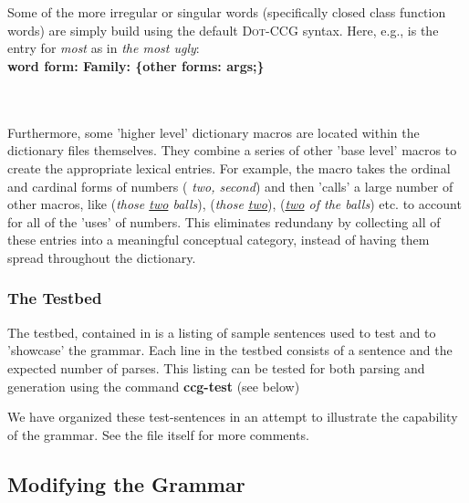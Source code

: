              
             
               \\ \\
Some of the more irregular or singular words (specifically closed class function words) are simply
build using the default \textsc{Dot-CCG} syntax. Here, e.g., is the entry for \emph{most} as in \emph{the most ugly}:  \\

\textbf{ word form: Family: \{other forms: args;\}  } 

 \\ \\
Furthermore, some 'higher level' dictionary macros are located within the dictionary files themselves.
They combine a series of other 'base level' macros to create the appropriate lexical entries. For example, the macro  takes the ordinal and cardinal forms of numbers ( \emph{two, second})  and then 'calls' a large number of other macros, like  (\emph{those \ul{two} balls}),  (\emph{those \ul{two}}),  (\emph{\ul{two} of the balls}) etc. to account for all of the 'uses' of numbers. This eliminates redundany by collecting all of these entries into a meaningful conceptual category,  instead of having them spread throughout the dictionary. 
      
\subsubsection{The Testbed}

The testbed, contained in  is a listing of sample sentences used to test and to 'showcase' the grammar. Each line in the testbed consists of a sentence and the expected number of parses. This listing can  be tested for both parsing and generation using the command \textbf{ccg-test} (see below)
   
We have organized these test-sentences in an attempt to illustrate the capability of the grammar. See the file itself for more comments.

\subsection{Modifying the Grammar}

